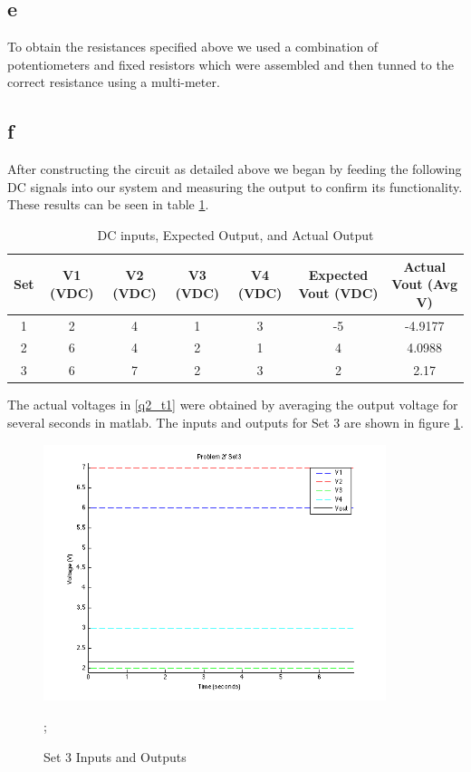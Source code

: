 \documentclass{article}
\theoremstyle{plain}
\theoremstyle{definition}
\theoremstyle{remark}
\begin{document}
\subsection*{e} 
To obtain the resistances specified above we used a combination of potentiometers and fixed resistors which were assembled and then tunned to the correct resistance using a multi-meter. 

\subsection*{f} 
After constructing the circuit as detailed above we began by feeding the following DC signals into our system and measuring the output to confirm its functionality.  These results can be seen in table \ref{q2_ft1}.

\begin{table}[hbt]
\begin{center}
    \begin{tabular}{|c|c|c|c|c|c|c|}
        \hline
        Set & V1 (VDC) & V2 (VDC) & V3 (VDC) & V4 (VDC) & Expected Vout (VDC) & Actual Vout (Avg V) \\ \hline
        1 & 2        & 4        & 1        & 3        & -5                  & -4.9177             \\ 
        2 & 6        & 4        & 2        & 1        & 4                   & 4.0988              \\ 
        3 & 6        & 7        & 2        & 3        & 2                   & 2.17                \\
        \hline
    \end{tabular}
\end{center}
\caption{DC inputs, Expected Output, and Actual Output}
\label{q2_ft1}
\end{table}

The actual voltages in \ref{q2_t1} were obtained by averaging the output voltage for several seconds in matlab.
The inputs and outputs for Set 3 are shown in figure \ref{q2_f1}.

\begin{figure}[h]
\begin{center}
\includegraphics[width=10cm]{problem2f_set3.png}
\end{center}
\caption{Set 3 Inputs and Outputs};
\label{q2_f1}
\end{figure}
\end{document}
